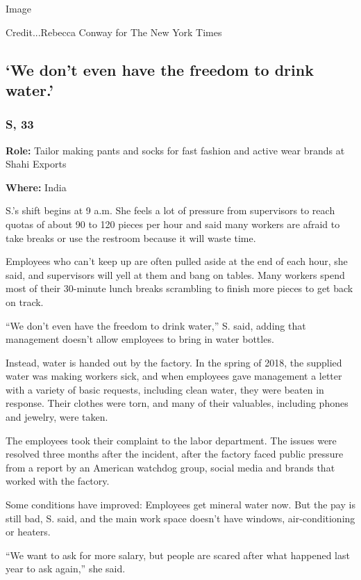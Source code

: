 Image

Credit...Rebecca Conway for The New York Times

\hypertarget{we-dont-even-have-the-freedom-to-drink-water}{%
\subsection{`We don't even have the freedom to drink
water.'}\label{we-dont-even-have-the-freedom-to-drink-water}}

\hypertarget{s-33}{%
\subsubsection{S, 33}\label{s-33}}

\textbf{Role:} Tailor making pants and socks for fast fashion and active
wear brands at Shahi Exports

\textbf{Where:} India

S.'s shift begins at 9 a.m. She feels a lot of pressure from supervisors
to reach quotas of about 90 to 120 pieces per hour and said many workers
are afraid to take breaks or use the restroom because it will waste
time.

Employees who can't keep up are often pulled aside at the end of each
hour, she said, and supervisors will yell at them and bang on tables.
Many workers spend most of their 30-minute lunch breaks scrambling to
finish more pieces to get back on track.

``We don't even have the freedom to drink water,'' S. said, adding that
management doesn't allow employees to bring in water bottles.

Instead, water is handed out by the factory. In the spring of 2018, the
supplied water was making workers sick, and when employees gave
management a letter with a variety of basic requests, including clean
water, they were beaten in response. Their clothes were torn, and many
of their valuables, including phones and jewelry, were taken.

The employees took their complaint to the labor department. The issues
were resolved three months after the incident, after the factory faced
public pressure from a report by an American watchdog group, social
media and brands that worked with the factory.

Some conditions have improved: Employees get mineral water now. But the
pay is still bad, S. said, and the main work space doesn't have windows,
air-conditioning or heaters.

``We want to ask for more salary, but people are scared after what
happened last year to ask again,'' she said.

